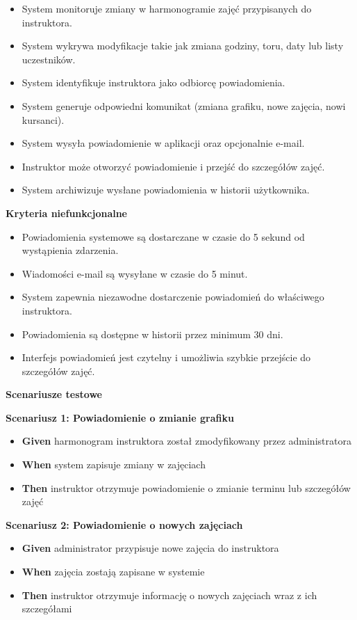 \documentclass[a4paper,12pt]{article}
\begin{document}
\begin{itemize}
    \item System monitoruje zmiany w harmonogramie zajęć przypisanych do instruktora.
    \item System wykrywa modyfikacje takie jak zmiana godziny, toru, daty lub listy uczestników.
    \item System identyfikuje instruktora jako odbiorcę powiadomienia.
    \item System generuje odpowiedni komunikat (zmiana grafiku, nowe zajęcia, nowi kursanci).
    \item System wysyła powiadomienie w aplikacji oraz opcjonalnie e-mail.
    \item Instruktor może otworzyć powiadomienie i przejść do szczegółów zajęć.
    \item System archiwizuje wysłane powiadomienia w historii użytkownika.
\end{itemize}

\noindent \textbf{Kryteria niefunkcjonalne}
\begin{itemize}
    \item Powiadomienia systemowe są dostarczane w czasie do 5 sekund od wystąpienia zdarzenia.
    \item Wiadomości e-mail są wysyłane w czasie do 5 minut.
    \item System zapewnia niezawodne dostarczenie powiadomień do właściwego instruktora.
    \item Powiadomienia są dostępne w historii przez minimum 30 dni.
    \item Interfejs powiadomień jest czytelny i umożliwia szybkie przejście do szczegółów zajęć.
\end{itemize}

\noindent \textbf{Scenariusze testowe}

\textbf{Scenariusz 1: Powiadomienie o zmianie grafiku}
\begin{itemize}
    \item \textbf{Given} harmonogram instruktora został zmodyfikowany przez administratora
    \item \textbf{When} system zapisuje zmiany w zajęciach
    \item \textbf{Then} instruktor otrzymuje powiadomienie o zmianie terminu lub szczegółów zajęć
\end{itemize}

\textbf{Scenariusz 2: Powiadomienie o nowych zajęciach}
\begin{itemize}
    \item \textbf{Given} administrator przypisuje nowe zajęcia do instruktora
    \item \textbf{When} zajęcia zostają zapisane w systemie
    \item \textbf{Then} instruktor otrzymuje informację o nowych zajęciach wraz z ich szczegółami
\end{itemize}
\end{document}
